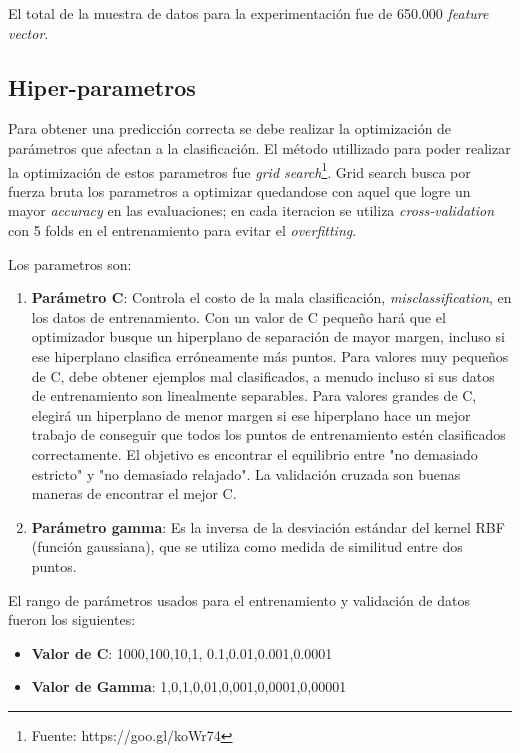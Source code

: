 El total de la muestra de datos para la experimentación fue de 650.000 \textit{feature vector}.

\subsection{Hiper-parametros}\label{sub:hiperparametro}


Para obtener una predicción correcta se debe realizar la optimización de parámetros que afectan a la clasificación. El método utillizado para poder realizar la optimización de estos parametros fue \textit{grid search}\footnote{Fuente: https://goo.gl/koWr74}.  Grid search busca por fuerza bruta los parametros a optimizar quedandose con aquel que logre un mayor \textit{accuracy} en las evaluaciones; en cada iteracion se utiliza \textit{cross-validation} con 5 folds en el entrenamiento para evitar el \textit{overfitting}.

Los parametros son:
\begin{enumerate}
	\item \textbf{Parámetro C}: Controla el costo de la mala clasificación, \textit{misclassification}, en los datos de entrenamiento. Con un valor de C pequeño hará que el optimizador busque un hiperplano de separación de mayor margen, incluso si ese hiperplano clasifica erróneamente más puntos. Para valores muy pequeños de C, debe obtener ejemplos mal clasificados, a menudo incluso si sus datos de entrenamiento son linealmente separables. Para valores grandes de C,  elegirá un hiperplano de menor margen si ese hiperplano hace un mejor trabajo de conseguir que todos los puntos de entrenamiento estén clasificados correctamente. El objetivo es encontrar el equilibrio entre "no demasiado estricto" y "no demasiado relajado". La validación cruzada  son buenas maneras de encontrar el mejor C.
	\item \textbf{Parámetro gamma}: Es la inversa de la desviación estándar del kernel RBF (función gaussiana), que se utiliza como medida de similitud entre dos puntos.
\end{enumerate}
	

El rango de parámetros usados para el entrenamiento y validación de datos fueron los siguientes:

\begin{itemize}
 \item \textbf{Valor de C}: 1000,100,10,1, 0.1,0.01,0.001,0.0001
 \item \textbf{Valor de Gamma}: 1,0,1,0,01,0,001,0,0001,0,00001
\end{itemize}




